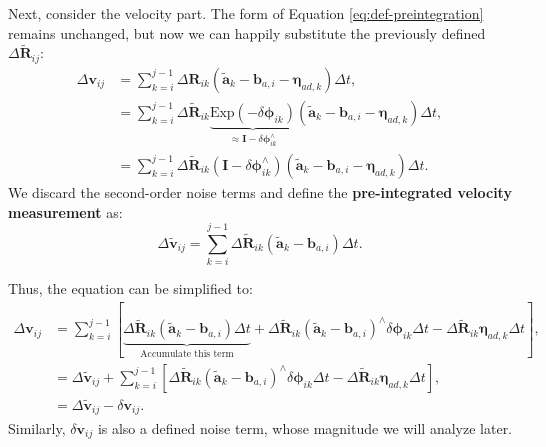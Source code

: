 Next, consider the velocity part. The form of Equation \eqref{eq:def-preintegration} remains unchanged, but now we can happily substitute the previously defined $\Delta \tilde{\bm{R}}_{ij}$:
\begin{equation}\label{key}
	\begin{aligned}
		\Delta \bm{v}_{ij} &= \sum_{k=i}^{j-1} \Delta \bm{R}_{ik} (\tilde{\bm{a}}_k - \bm{b}_{a,i} - 
		\boldsymbol{\eta}_{ad, k}) \Delta t, \\
		&=  \sum_{k=i}^{j-1} \Delta \tilde{\bm{R}}_{ik} \underbrace{\mathrm{Exp} (-\delta 
			\boldsymbol{\phi}_{ik})}_{\approx \bm{I} - \delta \boldsymbol{\phi}_{ik}^\wedge } 
		(\tilde{\bm{a}}_k - \bm{b}_{a,i} - \boldsymbol{\eta}_{ad, k}) \Delta t, \\
		&= \sum_{k=i}^{j-1} \Delta \tilde{\bm{R}}_{ik} (\bm{I} - \delta 
		\boldsymbol{\phi}^\wedge_{ik})(\tilde{\bm{a}}_k - \bm{b}_{a,i} - \boldsymbol{\eta}_{ad, k}) 
		\Delta t .
	\end{aligned}
\end{equation}
We discard the second-order noise terms and define the \textbf{pre-integrated velocity measurement} as:
\begin{equation}\label{key}
	\Delta \tilde{\bm{v}}_{ij} = \sum_{k=i}^{j-1} \Delta \tilde{\bm{R}}_{ik} (\tilde{\bm{a}}_k - \bm{b}_{a,i}) 
	\Delta t.
\end{equation}

Thus, the equation can be simplified to:
\begin{equation}\label{eq:def-of-delta-v}
	\begin{aligned}
		\Delta \bm{v}_{ij} &= \sum_{k=i}^{j-1} \left[\underbrace{\Delta \tilde{\bm{R}}_{ik} (\tilde{\bm{a}}_k - 
			\bm{b}_{a,i}) \Delta t}_{\text{Accumulate this term}} + \Delta \tilde{\bm{R}}_{ik} (\tilde{\bm{a}}_k - 
		\bm{b}_{a,i})^\wedge \delta \boldsymbol{\phi}_{ik} \Delta t - \Delta \tilde{\bm{R}}_{ik} 
		\boldsymbol{\eta}_{ad, k} \Delta t\right], \\
		&= \Delta \tilde{\bm{v}}_{ij} + \sum_{k=i}^{j-1} \left[\Delta \tilde{\bm{R}}_{ik} (\tilde{\bm{a}}_k - 
		\bm{b}_{a,i})^\wedge \delta \boldsymbol{\phi}_{ik} \Delta t - \Delta \tilde{\bm{R}}_{ik} 
		\boldsymbol{\eta}_{ad, k} \Delta t\right], \\
		&= \Delta \tilde{\bm{v}}_{ij} - \delta \bm{v}_{ij}.
	\end{aligned}
\end{equation}
Similarly, $\delta \bm{v}_{ij}$ is also a defined noise term, whose magnitude we will analyze later.

